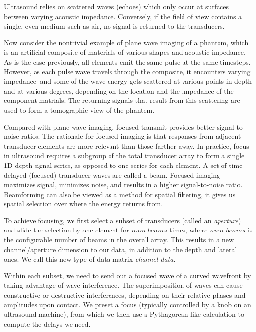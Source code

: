  Ultrasound relies on scattered waves (echoes) which only occur at surfaces between varying acoustic impedance. Conversely, if the field of view contains a single, even medium such as air, no signal is returned to the transducers.

 Now consider the nontrivial example of plane wave imaging of a phantom, which is an artificial composite of materials of various shapes and acoustic impedance. As is the case previously, all elements emit the same pulse at the same timesteps. However, as each pulse wave travels through the composite, it encounters varying impedance, and some of the wave energy gets scattered at various points in depth and at various degrees, depending on the location and the impedance of the component matrials. The returning signals that result from this scattering are used to form a tomographic view of the phantom.

 Compared with plane wave imaging, focused transmit provides better signal-to-noise ratios. The rationale for focused imaging is that responses from adjacent transducer elements are more relevant than those farther away. In practice, focus in ultrasound requires a subgroup of the total transducer array to form a single 1D depth-signal series, as opposed to one series for each element. A set of time-delayed (focused) transducer waves are called a beam. Focused imaging maximizes signal, minimizes noise, and results in a higher signal-to-noise ratio. Beamforming can also be viewed as a method for spatial filtering, it gives us spatial selection over where the energy returns from.

 To achieve focusing, we first select a subset of transducers (called an \textit{aperture}) and slide the selection by one element for $num\_beams$ times, where $num\_beams$ is the configurable number of beams in the overall array. This results in a new channel/aperture dimension to our data, in addition to the depth and lateral ones. We call this new type of data matrix \textit{channel data}. %

 Within each subset, we need to send out a focused wave of a curved wavefront by taking advantage of wave interference. The superimposition of waves can cause constructive or destructive interferences, depending on their relative phases and amplitudes upon contact. We preset a focus (typically controlled by a knob on an ultrasound machine), from which we then use a Pythagorean-like calculation to compute the delays we need.%

